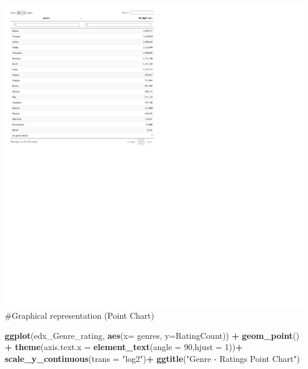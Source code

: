 \documentclass[
]{article}
\newenvironment{Shaded}{\begin{snugshade}}{\end{snugshade}}
\newcommand{\DataTypeTok}[1]{\textcolor[rgb]{0.13,0.29,0.53}{#1}}
\newcommand{\DecValTok}[1]{\textcolor[rgb]{0.00,0.00,0.81}{#1}}
\newcommand{\KeywordTok}[1]{\textcolor[rgb]{0.13,0.29,0.53}{\textbf{#1}}}
\newcommand{\NormalTok}[1]{#1}
\newcommand{\OperatorTok}[1]{\textcolor[rgb]{0.81,0.36,0.00}{\textbf{#1}}}
\newcommand{\StringTok}[1]{\textcolor[rgb]{0.31,0.60,0.02}{#1}}
\begin{document}
\includegraphics{MovieLensProjectReport_files/figure-latex/genres Rating Count-1.pdf}
\#Graphical representation (Point Chart)

\begin{Shaded}
\begin{Highlighting}[]
\KeywordTok{ggplot}\NormalTok{(edx_Genre_rating, }\KeywordTok{aes}\NormalTok{(}\DataTypeTok{x=}\NormalTok{ genres, }\DataTypeTok{y=}\NormalTok{RatingCount)) }\OperatorTok{+}
\StringTok{  }\KeywordTok{geom_point}\NormalTok{() }\OperatorTok{+}
\StringTok{  }\KeywordTok{theme}\NormalTok{(}\DataTypeTok{axis.text.x =} \KeywordTok{element_text}\NormalTok{(}\DataTypeTok{angle =} \DecValTok{90}\NormalTok{,}\DataTypeTok{hjust =} \DecValTok{1}\NormalTok{))}\OperatorTok{+}
\StringTok{  }\KeywordTok{scale_y_continuous}\NormalTok{(}\DataTypeTok{trans =} \StringTok{"log2"}\NormalTok{)}\OperatorTok{+}
\StringTok{  }\KeywordTok{ggtitle}\NormalTok{(}\StringTok{"Genre - Ratings Point Chart"}\NormalTok{)}
\end{Highlighting}
\end{Shaded}
\end{document}
